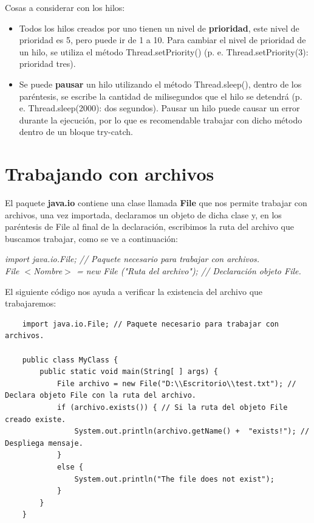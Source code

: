 Cosas a considerar con los hilos:
\begin{itemize}
    \item Todos los hilos creados por uno tienen un nivel de \textbf{prioridad}, este nivel de prioridad es 5, pero puede ir de 1 a 10. Para cambiar el nivel de prioridad de un hilo, se utiliza el método Thread.setPriority() (p. e. Thread.setPriority(3): prioridad tres).
    \item Se puede \textbf{pausar} un hilo utilizando el método Thread.sleep(), dentro de los paréntesis, se escribe la cantidad de milisegundos que el hilo se detendrá (p. e. Thread.sleep(2000): dos segundos). Pausar un hilo puede causar un error durante la ejecución, por lo que es recomendable trabajar con dicho método dentro de un bloque try-catch.
\end{itemize}



\section{Trabajando con archivos}
\hspace{0.55cm}El paquete \textbf{java.io} contiene una clase llamada \textbf{File} que nos permite trabajar con archivos, una vez importada, declaramos un objeto de dicha clase y, en los paréntesis de File al final de la declaración, escribimos la ruta del archivo que buscamos trabajar, como se ve a continuación:
\begin{center}
	\textit{
		import java.io.File; // Paquete necesario para trabajar con archivos. \\
		File $<$Nombre$>$ = new File ("Ruta del archivo"); // Declaración objeto File.
	}
\end{center}

El siguiente código nos ayuda a verificar la existencia del archivo que trabajaremos:
\begin{lstlisting}
    import java.io.File; // Paquete necesario para trabajar con archivos.

    public class MyClass {
        public static void main(String[ ] args) {
            File archivo = new File("D:\\Escritorio\\test.txt"); // Declara objeto File con la ruta del archivo.
            if (archivo.exists()) { // Si la ruta del objeto File creado existe.
                System.out.println(archivo.getName() +  "exists!"); // Despliega mensaje.
            }
            else { 
                System.out.println("The file does not exist");
            }
        }
    }
\end{lstlisting}


